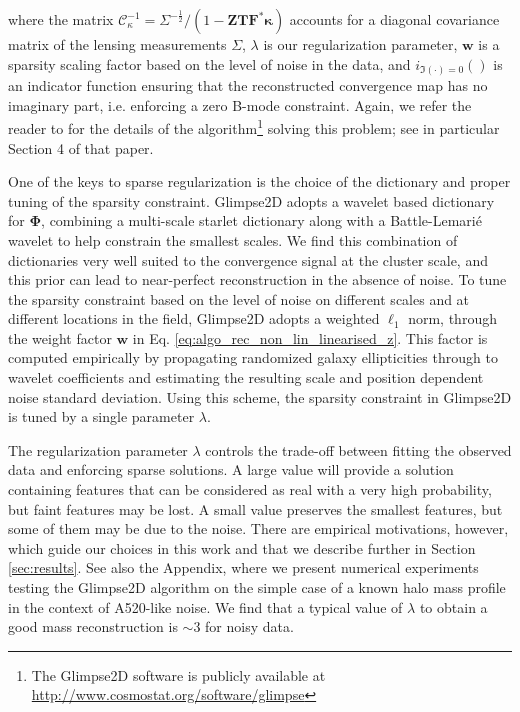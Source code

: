 \documentclass[iop,twocolappendix]{emulateapj}
\begin{document}
where the matrix 
$\mathcal{C}_\kappa^{-1} = \Sigma^{-\frac{1}{2}}/(1 -\bm{Z}  \mathbf{T} \mathbf{F}^* \bm{\kappa})$ 
accounts for a diagonal covariance matrix of the lensing measurements $\Sigma$, $\lambda$ is our 
regularization parameter, $\bm{w}$ is a sparsity scaling factor based on the level of noise in 
the data, and  $ i_{\Im(\cdot) = 0}()$ is an indicator function ensuring that the reconstructed 
convergence map has no imaginary part, i.e. enforcing a  zero B-mode constraint. Again, we refer 
the  reader to \cite{LSL.etal.2016} for the details of the algorithm\footnote{The Glimpse2D
software is publicly available at \url{http://www.cosmostat.org/software/glimpse}} solving this 
problem; see in particular Section 4 of that paper. 

One of the keys to sparse regularization is the choice of the dictionary and proper tuning of the 
sparsity constraint. Glimpse2D adopts a wavelet based dictionary for $\mathbf{\Phi}$, combining a 
multi-scale starlet dictionary \citep{SFM.2007} along with a Battle-Lemari\'e wavelet to help constrain 
the smallest scales. We find this combination of dictionaries very well suited to the convergence signal 
at the cluster scale, and this prior can lead to near-perfect reconstruction in the absence of noise. To 
tune the sparsity constraint based on the level of noise on different scales and at different locations 
in the field, Glimpse2D adopts a weighted $\ell_1$ norm, through the weight factor $\bm{w}$ in
Eq. \eqref{eq:algo_rec_non_lin_linearised_z}. This factor is computed empirically by propagating
randomized galaxy ellipticities through to wavelet coefficients and estimating the resulting scale 
and position dependent noise standard deviation. Using this scheme, the sparsity constraint in Glimpse2D 
is tuned by a single parameter $\lambda$. 

The regularization parameter $\lambda$ controls the trade-off between fitting the observed data and
enforcing sparse solutions. A large value will provide a solution containing features that can be
considered as real with a very high probability, but faint features may be lost. A small value preserves
the smallest features, but some of them may be due to the noise.
There are empirical motivations, however, which guide our choices in this work
and that we describe further in Section \ref{sec:results}. 
See also the Appendix, where we present numerical experiments testing the Glimpse2D algorithm
on the simple case of a known halo mass profile in the context of A520-like noise. We find that a typical 
value of $\lambda$ to obtain a good mass reconstruction is $\sim$3 for noisy data.
\end{document}
